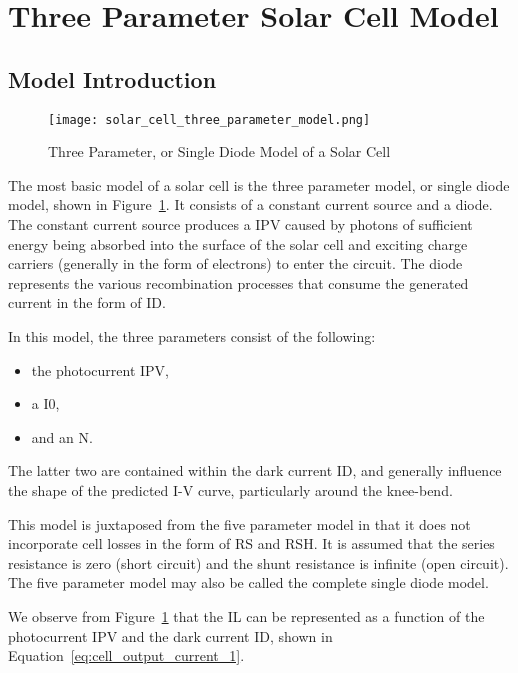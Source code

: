 \section{Three Parameter Solar Cell Model}\label{sec:three_parameter_solar_cell_model}

\subsection{Model Introduction}\label{subsec:three_param_model_introduction}

\begin{figure}[h]
    \texttt{[image: solar\_cell\_three\_parameter\_model.png]}
    \caption{Three Parameter, or Single Diode Model of a Solar Cell}
    \label{fig:single_diode_model}
\end{figure}

The most basic model of a solar cell is the three parameter model, or single
diode model, shown in Figure~\ref{fig:single_diode_model}. It consists of a
constant current source and a diode. The constant current source produces a
\ac{IPV} caused by photons of sufficient energy being absorbed into the surface
of the solar cell and exciting charge carriers (generally in the form of
electrons) to enter the circuit. The diode represents the various recombination
processes that consume the generated current in the form of \ac{ID}.

In this model, the three parameters consist of the following:

\begin{itemize}
    \item the photocurrent \ac{IPV},
    \item a \ac{I0},
    \item and an \ac{N}.
\end{itemize}

The latter two are contained within the dark current \ac{ID}, and generally
influence the shape of the predicted \ac{I-V} curve, particularly around the
knee-bend.

This model is juxtaposed from the five parameter model in that it does not
incorporate cell losses in the form of \ac{RS} and \ac{RSH}. It is assumed that
the series resistance is zero (short circuit) and the shunt resistance is
infinite (open circuit). The five parameter model may also be called the
complete single diode model.

We observe from Figure~\ref{fig:single_diode_model} that the \ac{IL} can be
represented as a function of the photocurrent \ac{IPV} and the dark current
\ac{ID}, shown in Equation~\ref{eq:cell_output_current_1}.


